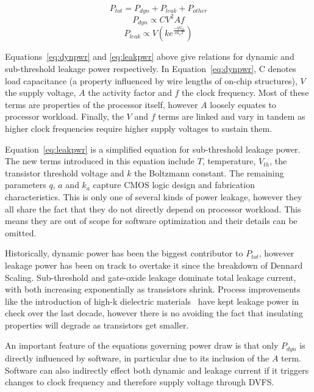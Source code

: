 \begin{equation}
\label{eq:totpwr}
P_{tot} = P_{dyn} + P_{leak} + P_{other}
\end{equation}
\begin{equation} 
\label{eq:dynpwr}
P_{dyn} \propto CV^{2}Af
\end{equation}
\begin{equation}
\label{eq:leakpwr}
P_{leak} \propto V\left(ke^{\frac{-qV_{th}}{ak_{a}T}}\right)
\end{equation}

Equations~\ref{eq:dynpwr} and \ref{eq:leakpwr} above give relations for dynamic and sub-threshold leakage power respectively. In Equation~\ref{eq:dynpwr}, C denotes load capacitance (a property influenced by wire lengths of on-chip structures), $V$ the supply voltage, $A$ the activity factor and $f$ the clock frequency. Most of these terms are properties of the processor itself, however $A$ loosely equates to processor workload. Finally, the $V$ and $f$ terms are linked and vary in tandem as higher clock frequencies require higher supply voltages to sustain them. \golden

Equation~\ref{eq:leakpwr} is a simplified equation for sub-threshold leakage power. The new terms introduced in this equation include $T$, temperature, $V_{th}$, the transistor threshold voltage and $k$ the Boltzmann constant. The remaining parameters $q$, $a$ and $k_{a}$ capture CMOS logic design and fabrication characteristics. This is only one of several kinds of power leakage, however they all share the fact that they do not directly depend on processor workload. This means they are out of scope for software optimization and their details can be omitted.

Historically, dynamic power has been the biggest contributor to $P_{tot}$, however leakage power has been on track to overtake it since the breakdown of Dennard Scaling.  Sub-threshold and gate-oxide leakage dominate total leakage current, with both increasing exponentially as transistors shrink. Process improvements like the introduction of high-k dielectric materials~\cite{jan:2009aa} have kept leakage power in check over the last decade, however there is no avoiding the fact that insulating properties will degrade as transistors get smaller. \golden

An important feature of the equations governing power draw is that only $P_{dyn}$ is directly influenced by software, in particular due to its inclusion of the $A$ term. Software can also indirectly effect both dynamic and leakage current if it triggers changes to clock frequency and therefore supply voltage through DVFS. \golden

